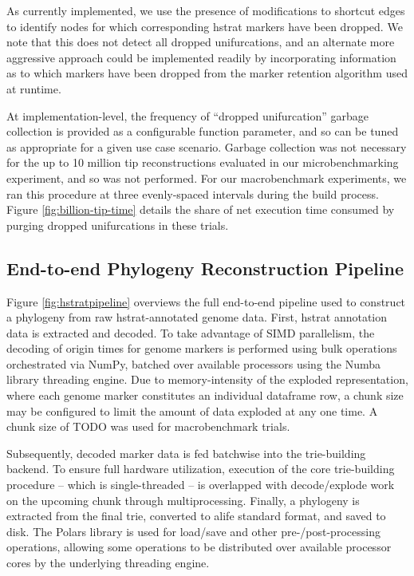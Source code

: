 As currently implemented, we use the presence of modifications to shortcut edges to identify nodes for which corresponding hstrat markers have been dropped.
We note that this does not detect all dropped unifurcations, and an alternate more aggressive approach could be implemented readily by incorporating information as to which markers have been dropped from the marker retention algorithm used at runtime.

At implementation-level, the frequency of ``dropped unifurcation'' garbage collection is provided as a configurable function parameter, and so can be tuned as appropriate for a given use case scenario.
Garbage collection was not necessary for the up to 10 million tip reconstructions evaluated in our microbenchmarking experiment, and so was not performed.
For our macrobenchmark experiments, we ran this procedure at three evenly-spaced intervals during the build process.
Figure \ref{fig:billion-tip-time} details the share of net execution time consumed by purging dropped unifurcations in these trials.

\subsection{End-to-end Phylogeny Reconstruction Pipeline}
\label{sec:pipeline}



Figure \ref{fig:hstratpipeline} overviews the full end-to-end pipeline used to construct a phylogeny from raw hstrat-annotated genome data.
First, hstrat annotation data is extracted and decoded.
To take advantage of SIMD parallelism, the decoding of origin times for genome markers is performed using bulk operations orchestrated via NumPy, batched over available processors using the Numba library threading engine.
Due to memory-intensity of the exploded representation, where each genome marker constitutes an individual dataframe row, a chunk size may be configured to limit the amount of data exploded at any one time.
A chunk size of TODO was used for macrobenchmark trials.

Subsequently, decoded marker data is fed batchwise into the trie-building backend.
To ensure full hardware utilization, execution of the core trie-building procedure -- which is single-threaded -- is overlapped with decode/explode work on the upcoming chunk through multiprocessing.
Finally, a phylogeny is extracted from the final trie, converted to alife standard format, and saved to disk.
The Polars library is used for load/save and other pre-/post-processing operations, allowing some operations to be distributed over available processor cores by the underlying threading engine.

